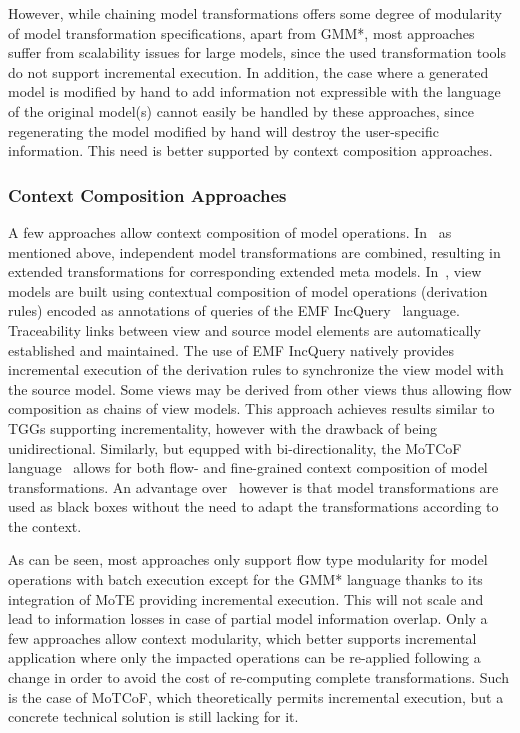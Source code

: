 However, while chaining model transformations offers some degree of modularity of model transformation specifications, apart from GMM*, most approaches suffer from scalability issues for large models, since the used transformation tools do not support incremental execution. In addition, the case where a generated model is modified by hand to add  information not expressible with the language of the original model(s) cannot easily be handled by these approaches, since regenerating the model modified by hand will destroy the user-specific information. This need is better supported by context composition approaches.
 
\subsubsection{Context Composition Approaches}
%
A few approaches allow context composition of model operations. In~\cite{EtienSAC2010} as mentioned above,  independent model transformations are combined, resulting in extended transformations for corresponding extended meta models. In~\cite{DebreceniFASE2014}, view models are built using contextual composition of model operations (derivation rules) encoded as annotations of queries  of the EMF IncQuery~\cite{EMF-IncQuery-website} language.  Traceability links between view and source model elements are automatically established and maintained. The use of EMF IncQuery natively provides incremental execution of the derivation rules to synchronize the view model with the source model. Some views may be derived from other
views thus allowing flow composition as chains of view models. This approach achieves results similar to TGGs supporting incrementality, however with the drawback of being unidirectional. Similarly, but equpped with bi-directionality, the MoTCoF language~\cite{SHNG11} allows for both flow- and fine-grained context composition of model transformations. An advantage over~\cite{EtienSAC2010} however is that model transformations are used as black boxes without the need to adapt the transformations according to the context.

As can be seen, most approaches only support flow type modularity for model
operations with batch execution except for the GMM* language thanks to its
integration of MoTE providing incremental execution. This will not scale and
lead to information losses in case of partial model information overlap. Only a
few approaches allow context modularity, which better supports incremental
application where only the impacted operations can be re-applied following a
change in order to avoid the cost of re-computing complete transformations.
Such is the case of MoTCoF, which theoretically permits incremental execution,
but a concrete technical solution is still lacking for it.

